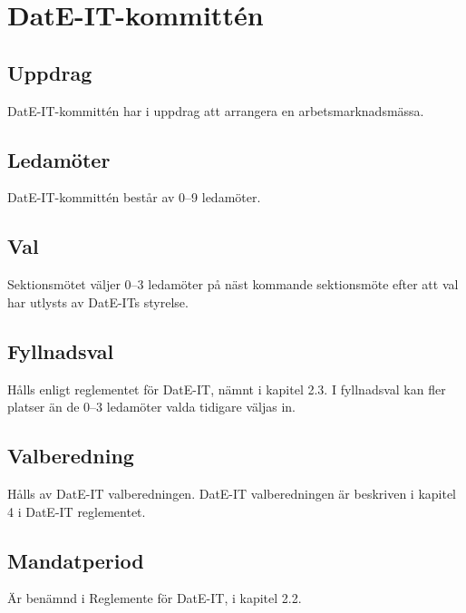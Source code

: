 \section{DatE-IT-kommittén}
\subsection{Uppdrag}
DatE-IT-kommittén har i uppdrag att arrangera en arbetsmarknadsmässa.
\subsection{Ledamöter}
DatE-IT-kommittén består av 0--9 ledamöter. 
\subsection{Val} 
Sektionsmötet väljer 0--3 ledamöter på näst kommande sektionsmöte efter att val har utlysts av DatE-ITs styrelse.
\subsection{Fyllnadsval}
Hålls enligt reglementet för DatE-IT, nämnt i kapitel 2.3.
I fyllnadsval kan fler platser än de 0--3 ledamöter valda tidigare väljas in.
\subsection{Valberedning}
Hålls av DatE-IT valberedningen.
DatE-IT valberedningen är beskriven i kapitel 4 i DatE-IT reglementet.
\subsection{Mandatperiod}
Är benämnd i Reglemente för DatE-IT, i kapitel 2.2.

\newpage
